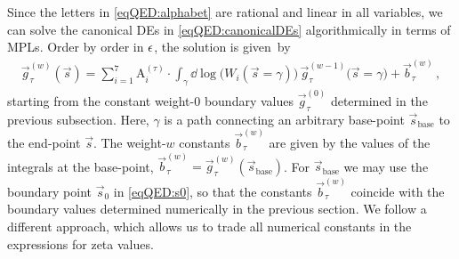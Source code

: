 \documentclass[main.tex]{subfiles}
\begin{document}
Since the letters in \cref{eqQED:alphabet} are rational and linear in all variables, we can solve the canonical DEs in \cref{eqQED:canonicalDEs} algorithmically in terms of MPLs. Order by order in $\epsilon$, the solution is given~by
\begin{align} \label{eqQED:solution}
\vec{g}^{(w)}_{\tau}(\vec{s}) = \sum_{i=1}^7 \mathrm{A}_i^{(\tau)} \cdot \int_{\gamma} \dd \log \bigl(W_i(\vec{s}=\gamma) \bigr) \, \vec{g}^{(w-1)}_{\tau}\bigl(\vec{s}=\gamma\bigr) + \vec{b}^{(w)}_{\tau} \,,
\end{align}
starting from the constant weight-$0$ boundary values $\vec{g}^{(0)}_{\tau}$ determined in the previous subsection. Here, $\gamma$ is a path connecting an arbitrary base-point $\vec{s}_{\mathrm{base}}$ to the end-point $\vec{s}$. The weight-$w$ constants $\vec{b}^{(w)}_{\tau} $ are given by the values of the integrals at the base-point, $ \vec{b}^{(w)}_{\tau} = \vec{g}^{(w)}_{\tau}(\vec{s}_{\mathrm{base}})$.
For $\vec{s}_{\mathrm{base}}$ we may use the boundary point $\vec{s}_0$ in \cref{eqQED:s0}, so that the constants $\vec{b}^{(w)}_{\tau}$ coincide with the boundary values determined numerically in the previous section. We follow a different approach, which allows us to trade all numerical constants in the expressions for zeta values.
\end{document}
